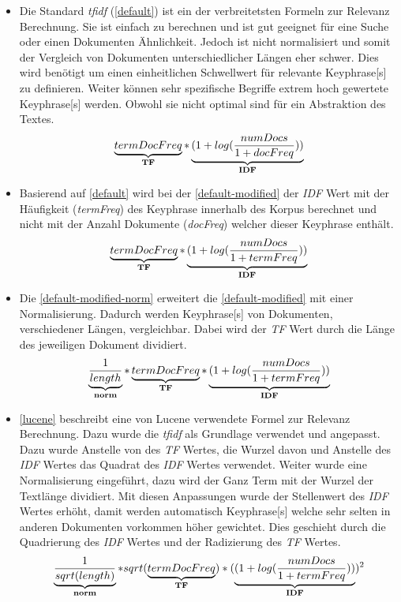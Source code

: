 \begin{itemize}
    \item Die Standard \textit{tfidf} (\autoref{default}) ist ein der verbreitetsten Formeln zur Relevanz Berechnung. Sie ist einfach zu berechnen und ist gut geeignet für eine Suche oder einen Dokumenten Ähnlichkeit. Jedoch ist nicht normalisiert und somit der Vergleich von Dokumenten unterschiedlicher Längen eher schwer. Dies wird benötigt um einen einheitlichen Schwellwert für relevante \gls{Keyphrase}[s] zu definieren. Weiter können sehr spezifische Begriffe extrem hoch gewertete \gls{Keyphrase}[s] werden. Obwohl sie nicht optimal sind für ein Abstraktion des Textes. 
    \begin{equation}\label{default}
    \underbrace{termDocFreq}_\text{\textbf{TF}} * \underbrace{ (1 +log( \frac{numDocs}{1 + docFreq}))}_\text{\textbf{IDF}}
    \end{equation}
    \item Basierend auf \autoref{default} wird bei der \autoref{default-modified} der \textit{IDF} Wert mit der Häufigkeit (\textit{termFreq}) des \gls{Keyphrase} innerhalb des Korpus berechnet und nicht mit der Anzahl Dokumente (\textit{docFreq}) welcher dieser \gls{Keyphrase} enthält. 
    \begin{equation}\label{default-modified}
    \underbrace{termDocFreq}_\text{\textbf{TF}} *  \underbrace{ (1 +log( \frac{numDocs}{1 + termFreq}))}_\text{\textbf{IDF}} 
    \end{equation}
    \item Die \autoref{default-modified-norm} erweitert die \autoref{default-modified} mit einer Normalisierung. Dadurch werden \gls{Keyphrase}[s] von Dokumenten, verschiedener Längen, vergleichbar. Dabei wird der \textit{TF} Wert durch die Länge des jeweiligen Dokument dividiert.
    \begin{equation}\label{default-modified-norm}
    \underbrace{ \frac{1}{length} }_\text{\textbf{norm}}  * \underbrace{termDocFreq}_\text{\textbf{TF}} *  \underbrace{ (1 +log( \frac{numDocs}{1 + termFreq}))}_\text{\textbf{IDF}}
    \end{equation}
    \item \autoref{lucene} beschreibt eine von \gls{Lucene} verwendete Formel zur Relevanz Berechnung. Dazu wurde die \textit{tfidf} als Grundlage verwendet und angepasst. Dazu wurde Anstelle von des \textit{TF} Wertes, die Wurzel davon und Anstelle des \textit{IDF} Wertes das Quadrat des \textit{IDF} Wertes verwendet. Weiter wurde eine Normalisierung eingeführt, dazu wird der Ganz Term mit der Wurzel der Textlänge dividiert. Mit diesen Anpassungen wurde der Stellenwert des \textit{IDF} Wertes erhöht, damit werden automatisch \gls{Keyphrase}[s] welche sehr selten in anderen Dokumenten vorkommen höher gewichtet. Dies geschieht durch die Quadrierung des \textit{IDF} Wertes und der Radizierung des \textit{TF} Wertes.
    \begin{equation}\label{lucene}
    \underbrace{ \frac{1}{sqrt(length)} }_\text{\textbf{norm}} * sqrt(\underbrace{termDocFreq}_\text{\textbf{TF}}) *  (\underbrace{(1 +log( \frac{numDocs}{1 + termFreq}))}_\text{\textbf{IDF}})^{2}
    \end{equation}
\end{itemize}


